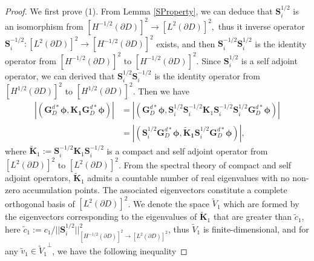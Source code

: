 \documentclass[11pt,reqno,twoside]{amsart}
\theoremstyle{definition}
\theoremstyle{remark}
\numberwithin{equation}{section}
\begin{document}
	\begin{proof}

    We first prove (1).
    From Lemma \ref{SProperty}, we can deduce that $\mathbf S_{i}^{1/2}$ is an isomorphism from $\left[H^{-1/2}\left(\partial D\right) \right] ^2 \to \left[L^2\left(\partial D\right) \right] ^2 ,$  thus it inverse operator $\mathbf S_{i}^{-1/2}:\left[L^2\left(\partial D\right) \right] ^2 \to \left[H^{-1/2}\left(\partial D\right) \right] ^2$  exists, and then $\mathbf S_{i}^{-1/2} \mathbf S_{i}^{1/2}$ is the identity operator from $\left[H^{-1/2}\left(\partial D\right) \right] ^2$ to $\left[H^{-1/2}\left(\partial D\right) \right] ^2$. Since $\mathbf S_{i}^{1/2}$ is a self adjoint operator, we can derived that $\mathbf S_{i}^{1/2} \mathbf S_{i}^{-1/2}$ is the identity operator from $\left[H^{1/2}\left(\partial D\right) \right] ^2$ to $\left[H^{1/2}\left(\partial D\right) \right] ^2$. Then we have
\begin{equation}\begin{aligned} \label{eq:inequality1}
	\left|\left( \mathbf G_D^{d*} \mathbf {\phi} , \mathbf {K_1}\mathbf{G}_D^{d*} \mathbf {\phi}\right) \right|
	 & =\left|\left( \mathbf G_D^{d*} \mathbf {\phi}, \mathbf S_{i}^{1/2} \mathbf S_{i}^{-1/2} \mathbf K_1 \mathbf S_{i}^{-1/2} \mathbf S_{i}^{1/2} \mathbf {G}_D^{d*} \mathbf {\phi}\right)\right|\\
		& =\left|\left( \mathbf S_{i}^{1/2} \mathbf {G}_D^{d*} \mathbf {\phi}, \mathbf {\tilde K_1}\mathbf S_{i}^{1/2} \mathbf {G}_D^{d*} \mathbf {\phi} \right)\right|,
	\end{aligned}\end{equation}
	where $ \mathbf {\tilde K}_1:=\mathbf S_{i}^{-1/2} \mathbf K_1 \mathbf S_{i}^{-1/2}$ is a compact and self adjoint operator from $\left[L^2\left(\partial D\right) \right] ^2$ to $\left[L^2\left(\partial D\right) \right] ^2$. From the spectral theory of compact and self adjoint operators, $\mathbf {\tilde K}_1$ admits a countable number of real eigenvalues with no non-zero accumulation points. The associated eigenvectors constitute a complete orthogonal basis of $\left[L^2\left(\partial D\right) \right] ^2$. We denote the space $\tilde V_1$ which are formed by the eigenvectors corresponding to the eigenvalues of $\mathbf {\tilde K} _1$ that are greater than $\tilde c_1$, here $\tilde c_1:=c_1/{||\mathbf S^{1/2}_i||^2_{\left[H^{-1/2}\left(\partial D\right) \right] ^2 \to \left[L^2\left(\partial D\right) \right] ^2}}$, thus $\tilde V_1$ is finite-dimensional, and for any $\tilde v_1 \in {\tilde V_1}^{\perp} $, we have the following inequality

\end{proof}
\end{document}
